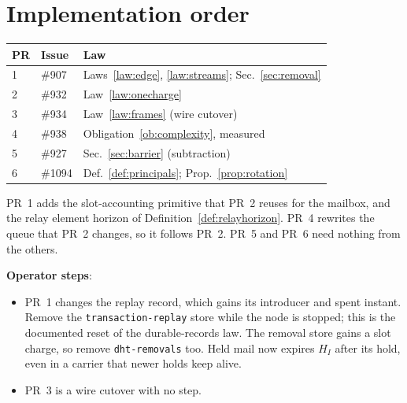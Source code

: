 \documentclass[journal]{IEEEtran}
\newcommand{\issue}[1]{\#{#1}}
\begin{document}
\section{Implementation order}\label{sec:plan}

\begin{center}
\footnotesize
\begin{tabular}{@{}llp{}@{}}
\toprule
PR & Issue & Law\\
\midrule
1 & \issue{907} & Laws~\ref{law:edge}, \ref{law:streams}; Sec.~\ref{sec:removal}\\
2 & \issue{932} & Law~\ref{law:onecharge}\\
3 & \issue{934} & Law~\ref{law:frames} (wire cutover)\\
4 & \issue{938} & Obligation~\ref{ob:complexity}, measured\\
5 & \issue{927} & Sec.~\ref{sec:barrier} (subtraction)\\
6 & \issue{1094} & Def.~\ref{def:principals}; Prop.~\ref{prop:rotation}\\
\bottomrule
\end{tabular}
\end{center}

PR~1 adds the slot-accounting primitive that PR~2 reuses for the mailbox, and the relay
element horizon of Definition~\ref{def:relayhorizon}.  PR~4 rewrites the
queue that PR~2 changes, so it follows PR~2.  PR~5 and PR~6 need nothing from the others.

\textbf{Operator steps}:
\begin{itemize}[leftmargin=1.2em]
\item PR~1 changes the replay record, which gains its introducer and spent instant.  Remove the
\texttt{transaction-replay} store while the node is stopped; this is the documented reset of
the durable-records law.  The removal store gains a slot charge, so remove
\texttt{dht-removals} too.  Held mail now expires $H_I$ after its hold, even in a carrier that
newer holds keep alive.
\item PR~3 is a wire cutover with no step.
\end{itemize}

\sloppy


\end{document}
